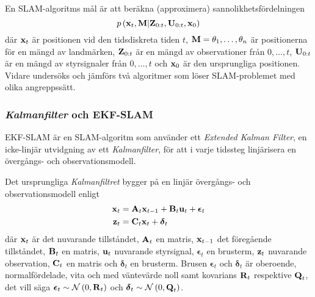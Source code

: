 \documentclass[11pt]{article}
\newcommand{\bfr}[1]{\textbf{\textrm{{#1}}}}
\begin{document}
\begin{flushleft}
En SLAM-algoritms mål är att beräkna (approximera) sannolikhetsfördelningen
\begin{equation*}
	p\left(\textbf{\textrm{x}}_{t},\textbf{\textrm{M}} \vert \textbf{\textrm{Z}}_{0:t}, \textbf{\textrm{U}}_{0:t}, \textbf{\textrm{x}}_0 \right)
\end{equation*}
där $\textbf{\textrm{x}}_t$ är positionen vid den tidsdiskreta tiden $t$, $\textbf{\textrm{M}}=\theta_1,\ldots,\theta_n$ är positionerna för en mängd av landmärken, $\textbf{\textrm{Z}}_{0:t}$ är en mängd av observationer från $0,\ldots,t$, $\textbf{\textrm{U}}_{0:t}$ är en mängd av styrsignaler från $0,\ldots,t$ och $\textbf{\textrm{x}}_0$ är den ursprungliga positionen. Vidare undersöks och jämförs två algoritmer som löser SLAM-problemet med olika angreppssätt.   

\subsubsection{\emph{Kalmanfilter} och EKF-SLAM}
EKF-SLAM är en SLAM-algoritm som använder ett \emph{Extended Kalman Filter}, en icke-linjär utvidgning av ett \emph{Kalmanfilter}, för att i varje tidssteg  linjärisera en övergångs- och observationsmodell.

Det ursprungliga \emph{Kalmanfiltret} bygger på en linjär övergångs- och observationsmodell enligt
\begin{align*}
	\bfr{x}_t &= \bfr{A}_{t}\bfr{x}_{t-1} + \bfr{B}_{t}\bfr{u}_t + \boldsymbol{\epsilon}_t \\
	\bfr{z}_t &= \bfr{C}_{t}\bfr{x}_t + \boldsymbol{\delta}_t
\end{align*}
där $\bfr{x}_t$ är det nuvarande tillståndet, $\bfr{A}_t$ en matris, $\bfr{x}_{t-1}$ det föregående tillståndet, $\bfr{B}_t$ en matris, $\bfr{u}_t$ nuvarande styrsignal, $\boldsymbol{\epsilon}_t$ en brusterm, $\bfr{z}_t$ nuvarande observation, $\bfr{C}_t$ en matris och $\boldsymbol{\delta}_t$ en brusterm. Brusen $\boldsymbol{\epsilon}_t$ och $\boldsymbol{\delta}_t$ är oberoende, normalfördelade, vita och  med väntevärde noll samt kovarians $\bfr{R}_t$ respektive $\bfr{Q}_t$, det vill säga $\boldsymbol{\epsilon}_t \sim \mathcal{N}\left(0,\bfr{R}_t\right)$ och $\boldsymbol{\delta}_t \sim \mathcal{N}\left(0,\bfr{Q}_t\right)$.


\end{flushleft}
\end{document}
